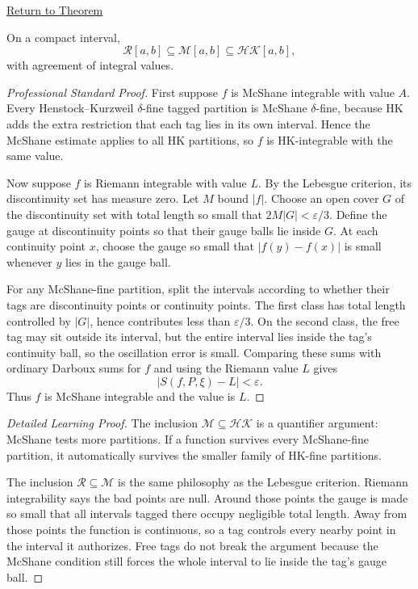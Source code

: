\newpage
{}
\label{prf:riemann-mcshane-hk-inclusions}
\begin{remark*}[Return]\hyperref[thm:riemann-mcshane-hk-inclusions]{Return to Theorem}\end{remark*}
\begin{theorem*}
On a compact interval,
\[
  \mathcal R[a,b]\subseteq \mathcal M[a,b]\subseteq \mathcal{HK}[a,b],
\]
with agreement of integral values.
\end{theorem*}
\begin{proof}[Professional Standard Proof]
\LRAProofBodyStart
First suppose \(f\) is McShane integrable with value \(A\). Every
Henstock--Kurzweil \(\delta\)-fine tagged partition is McShane
\(\delta\)-fine, because HK adds the extra restriction that each tag lies in
its own interval. Hence the McShane estimate applies to all HK partitions, so
\(f\) is HK-integrable with the same value.

Now suppose \(f\) is Riemann integrable with value \(L\). By the Lebesgue
criterion, its discontinuity set has measure zero. Let \(M\) bound \(|f|\).
Choose an open cover \(G\) of the discontinuity set with total length so small
that \(2M|G|<\varepsilon/3\). Define the gauge at discontinuity points so that
their gauge balls lie inside \(G\). At each continuity point \(x\), choose the
gauge so small that \(|f(y)-f(x)|\) is small whenever \(y\) lies in the gauge
ball.

For any McShane-fine partition, split the intervals according to whether
their tags are discontinuity points or continuity points. The first class has
total length controlled by \(|G|\), hence contributes less than
\(\varepsilon/3\). On the second class, the free tag may sit outside its
interval, but the entire interval lies inside the tag's continuity ball, so
the oscillation error is small. Comparing these sums with ordinary Darboux
sums for \(f\) and using the Riemann value \(L\) gives
\[
  |S(f,P,\xi)-L|<\varepsilon.
\]
Thus \(f\) is McShane integrable and the value is \(L\).
\end{proof}
\begin{proof}[Detailed Learning Proof]
\LRAProofBodyStart
The inclusion \(\mathcal M\subseteq\mathcal{HK}\) is a quantifier argument:
McShane tests more partitions. If a function survives every McShane-fine
partition, it automatically survives the smaller family of HK-fine partitions.

The inclusion \(\mathcal R\subseteq\mathcal M\) is the same philosophy as the
Lebesgue criterion. Riemann integrability says the bad points are null. Around
those points the gauge is made so small that all intervals tagged there occupy
negligible total length. Away from those points the function is continuous, so
a tag controls every nearby point in the interval it authorizes. Free tags do
not break the argument because the McShane condition still forces the whole
interval to lie inside the tag's gauge ball.
\end{proof}
